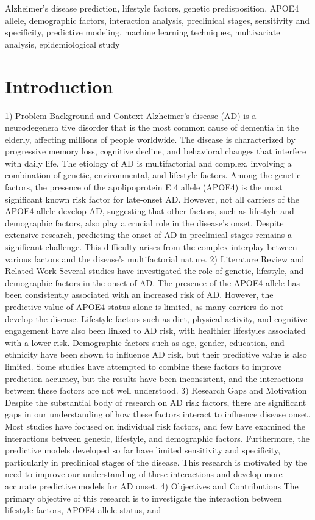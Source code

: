 \documentclass[conference]{IEEEtran}
\begin{document}
\begin{IEEEkeywords}
Alzheimer's disease prediction, lifestyle factors, genetic predisposition, APOE4 allele, demographic factors, interaction analysis, preclinical stages, sensitivity and specificity, predictive modeling, machine learning techniques, multivariate analysis, epidemiological study
\end{IEEEkeywords}

\section{Introduction}
1) Problem Background and Context Alzheimer's disease (AD) is a neurodegenera tive disorder that is the most common cause of dementia in the elderly, affecting millions of people worldwide. The disease is characterized by progressive memory loss, cognitive decline, and behavioral changes that interfere with daily life. The etiology of AD is multifactorial and complex, involving a combination of genetic, environmental, and lifestyle factors. Among the genetic factors, the presence of the apolipoprotein E 4 allele (APOE4) is the most significant known risk factor for late-onset AD. However, not all carriers of the APOE4 allele develop AD, suggesting that other factors, such as lifestyle and demographic factors, also play a crucial role in the disease's onset. Despite extensive research, predicting the onset of AD in preclinical stages remains a significant challenge. This difficulty arises from the complex interplay between various factors and the disease's multifactorial nature. 2) Literature Review and Related Work Several studies have investigated the role of genetic, lifestyle, and demographic factors in the onset of AD. The presence of the APOE4 allele has been consistently associated with an increased risk of AD. However, the predictive value of APOE4 status alone is limited, as many carriers do not develop the disease. Lifestyle factors such as diet, physical activity, and cognitive engagement have also been linked to AD risk, with healthier lifestyles associated with a lower risk. Demographic factors such as age, gender, education, and ethnicity have been shown to influence AD risk, but their predictive value is also limited. Some studies have attempted to combine these factors to improve prediction accuracy, but the results have been inconsistent, and the interactions between these factors are not well understood. 3) Research Gaps and Motivation Despite the substantial body of research on AD risk factors, there are significant gaps in our understanding of how these factors interact to influence disease onset. Most studies have focused on individual risk factors, and few have examined the interactions between genetic, lifestyle, and demographic factors. Furthermore, the predictive models developed so far have limited sensitivity and specificity, particularly in preclinical stages of the disease. This research is motivated by the need to improve our understanding of these interactions and develop more accurate predictive models for AD onset. 4) Objectives and Contributions The primary objective of this research is to investigate the interaction between lifestyle factors, APOE4 allele status, and 
\end{document}
